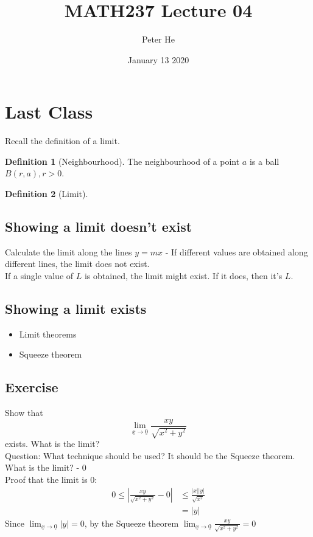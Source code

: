 \documentclass[12pt]{article}
\title{MATH237 Lecture 04}
\author{Peter He}
\date{January 13 2020}
\theoremstyle{definition}
\newtheorem{definition}{Definition}[section]
\begin{document}
\maketitle

\section{Last Class}
Recall the definition of a limit.
\begin{definition}[Neighbourhood]
    The neighbourhood of a point $a$ is a ball $B(r, a), r>0$.
\end{definition}

\begin{definition}[Limit]

\end{definition}

\subsection{Showing a limit doesn't exist}
Calculate the limit along the lines $y=mx$ - If different values are obtained along different lines, the limit does not exist.\\
If a single value of $L$ is obtained, the limit might exist. If it does, then it's $L$.

\subsection{Showing a limit exists}
\begin{itemize}
    \item Limit theorems
    \item Squeeze theorem 
\end{itemize}

\subsection{Exercise}
Show that \[\lim_{\underline x\to\underline 0}\frac{xy}{\sqrt{x^2+y^2}}\] exists. What is the limit?\\
Question: What technique should be used? It should be the Squeeze theorem.\\
What is the limit? - 0\\
Proof that the limit is 0:
\begin{align*}
    0\leq |\frac{xy}{\sqrt{x^2+y^2}}-0|&\leq \frac{|x||y|}{\sqrt{x^2}}\\
    &=|y|
\end{align*}
Since $\lim_{\underline x\to\underline 0}|y|=0$, by the Squeeze theorem $\lim_{\underline x\to\underline 0}\frac{xy}{\sqrt{x^2+y^2}}=0$
\end{document}
